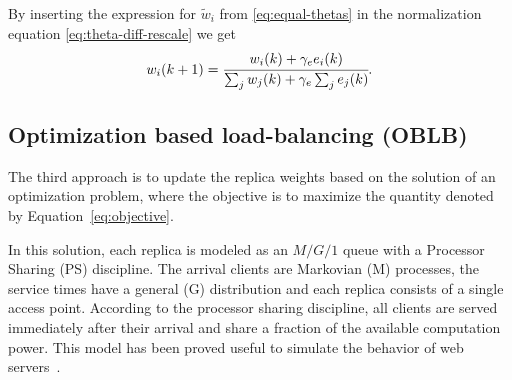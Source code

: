 By inserting the expression for $\tilde w_i$ from
\eqref{eq:equal-thetas} in the normalization equation
\eqref{eq:theta-diff-rescale} we get
\begin{equation}
  w_i(k+1)=\cfrac{w_i(k)+\gamma_ee_i(k)}{\sum_jw_j(k)+\gamma_e\sum_je_j(k)} .
\label{eq:weights}
\end{equation}


\subsection{Optimization based load-balancing (OBLB)}

The third approach is to update the replica weights based on the
solution of an optimization problem, where the objective is to
maximize the quantity denoted by Equation~\eqref{eq:objective}.

In this solution, each replica is modeled as an $M/G/1$ queue with a
Processor Sharing (PS) discipline. The arrival clients are Markovian
(M) processes, the service times have a general (G) distribution and
each replica consists of a single access point. According to the 
processor sharing discipline, all clients are served immediately after 
their arrival and share a fraction of the available computation power. 
This model has been proved useful to simulate the behavior of web 
servers~\cite{kihlws}.


